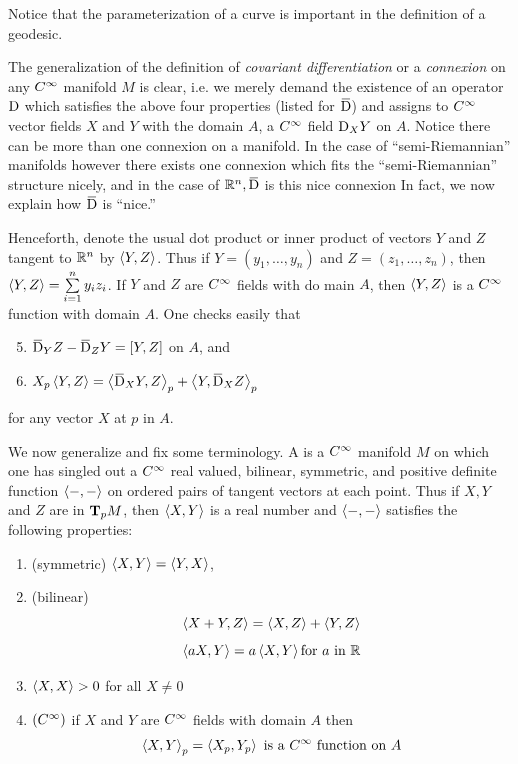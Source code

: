 \documentclass[../main]{subfiles}
\begin{document}
Notice that the parameterization of a curve is important in the definition of a geodesic.

The generalization of the definition of \emph{covariant differentiation} or a \emph{connexion} on any $\CInfty$ manifold $M$ is clear, i.e. we merely demand the existence of an operator $\connection$ which satisfies the above four properties (listed for $\covariant$) and assigns to $\CInfty$ vector fields $X$ and $Y$ with the domain $A$, a $\CInfty$ field $\connection_{X} Y$ on $A$. Notice there can be more than one connexion on a manifold. In the case of ``semi-Riemannian'' manifolds however there exists one connexion which fits the ``semi-Riemannian'' structure nicely, and in the case of $\bR^{n}, \covariant$ is this nice connexion In fact, we now explain how $\covariant$ is ``nice.''

Henceforth, denote the usual dot product or inner product of vectors $Y$ and $Z$ tangent to $\bR^{n}$ by $\ip{Y}{Z}$. Thus if $Y=(y_{1}, \ldots, y_{n})$ and $Z= (z_{1}, \ldots, z_{n})$, then $\ip{Y}{Z}=\sum\limits_{i=1}^{n} y_{i} z_{i}$. If $Y$ and $Z$ are $\CInfty$ fields with do main $A$, then $\ip{Y}{Z}$ is a $\CInfty$ function with domain $A$. One checks easily that
\begin{enumerate}[label = (\arabic*)]
    \setcounter{enumi}{4}
    \item \label{enu:ch02.1.5} $\covariant_{Y} Z-\covariant_{Z} Y=[Y, Z]$ on $A$, and 
    \item \label{enu:ch02.1.6}$X_{p}\ip{Y}{Z}=\ip{\covariant_{X} Y}{Z}_{p}+\ip{Y}{\covariant_X Z}_p$
\end{enumerate}
for any vector $X$ at $p$ in $A$.

We now generalize and fix some terminology. A  is a $\CInfty$ manifold $M$ on which one has singled out a $\CInfty$ real valued, bilinear, symmetric, and positive definite function $\ip{-}{-}$ on ordered pairs of tangent vectors at each point. Thus if $X,Y$ and $Z$ are in $\tangentspace{M}{p}$, then $\ip{X}{Y}$ is a real number and $\ip{-}{-}$ satisfies the following properties:

\begin{enumerate}[label=(\alph*)]
    \item(symmetric) $\ip{X}{Y}= \ip{Y}{X}$, \label{enu:ch02.1.a}
    \item (bilinear) \[\ip{X+Y}{Z} = \ip{X}{Z}+\ip{Y}{Z}\]\[ \ip{aX}{Y} = a\ip{X}{Y} \text{for }a\text{ in } \bR\]\label{enu:ch02.1.b}
    \item\label{enu:ch02.1.c} $\ip{X}{X} >0$ for all $X\neq 0$
    \item $(\CInfty)$ if $X$ and $Y$ are $\CInfty$ fields with domain $A$ then 
    \[\ip{X}{Y}_p = \ip{X_p}{Y_p}\text{ is a } \CInfty\text{ function on } A\]\label{enu:ch02.1.d}
\end{enumerate}
\end{document}
